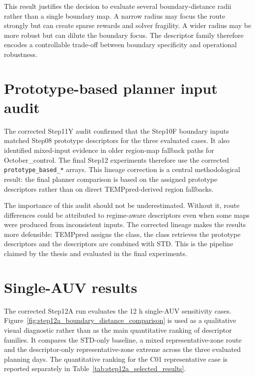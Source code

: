 This result justifies the decision to evaluate several boundary-distance radii rather than a single boundary map. A narrow radius may focus the route strongly but can create sparse rewards and solver fragility. A wider radius may be more robust but can dilute the boundary focus. The descriptor family therefore encodes a controllable trade-off between boundary specificity and operational robustness.

\section{Prototype-based planner input audit}

The corrected Step11Y audit confirmed that the Step10F boundary inputs matched Step08 prototype descriptors for the three evaluated cases. It also identified mixed-input evidence in older region-map fallback paths for October\_control. The final Step12 experiments therefore use the corrected \texttt{prototype\_based\_*} arrays. This lineage correction is a central methodological result: the final planner comparison is based on the assigned prototype descriptors rather than on direct TEMPpred-derived region fallbacks.

The importance of this audit should not be underestimated. Without it, route differences could be attributed to regime-aware descriptors even when some maps were produced from inconsistent inputs. The corrected lineage makes the results more defensible: TEMPpred assigns the class, the class retrieves the prototype descriptors and the descriptors are combined with STD. This is the pipeline claimed by the thesis and evaluated in the final experiments.

\section{Single-AUV results}

The corrected Step12A run evaluates the 12 h single-AUV sensitivity cases. Figure~\ref{fig:step12a_boundary_distance_comparison} is used as a qualitative visual diagnostic rather than as the main quantitative ranking of descriptor families. It compares the STD-only baseline, a mixed representative-zone route and the descriptor-only representative-zone extreme across the three evaluated planning days. The quantitative ranking for the C01 representative case is reported separately in Table~\ref{tab:step12a_selected_results}.

